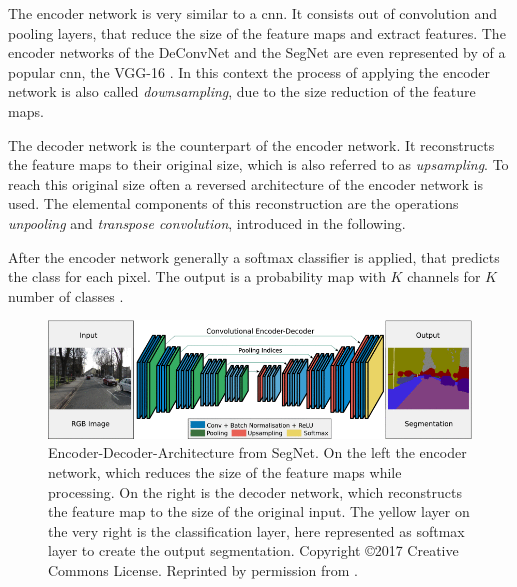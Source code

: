 The encoder network is very similar to a \gls{cnn}.
It consists out of convolution and pooling layers, that reduce the size of the feature maps and extract features.
The encoder networks of the DeConvNet \cite{NHH15-DeConvNet} and the SegNet \cite{Bad17-SegNet} are even represented by of a popular \gls{cnn}, the VGG-16 \cite{SZ15-VGG16}. 
In this context the process of applying the encoder network is also called \textit{downsampling}, due to the size reduction of the feature maps.

The decoder network is the counterpart of the encoder network.
It reconstructs the feature maps to their original size, which is also referred to as \textit{upsampling}.
To reach this original size often a reversed architecture of the encoder network is used.
The elemental components of this reconstruction are the operations \textit{unpooling} and \textit{transpose convolution}, introduced in the following.

After the encoder network generally a softmax classifier is applied, that predicts the class for each pixel.
The output is a probability map with $K$ channels for $K$ number of classes \cite{Bad17-SegNet}.

\begin{figure}
	\includegraphics[width=\linewidth]{figures/chap223_segnet_arch.png}
	\caption[Encoder-Decoder-Architecture]{
		Encoder-Decoder-Architecture from SegNet. 
		On the left the encoder network, which reduces the size of the feature maps while processing. 
		On the right is the decoder network, which reconstructs the feature map to the size of the original input. 
		The yellow layer on the very right is the classification layer, here represented as softmax layer to create the output segmentation. 
		Copyright \copyright 2017 Creative Commons License. Reprinted by permission from \cite{Bad17-SegNet}.}
	\label{fig:ch2:sec2:encoder-decoder}
\end{figure}

